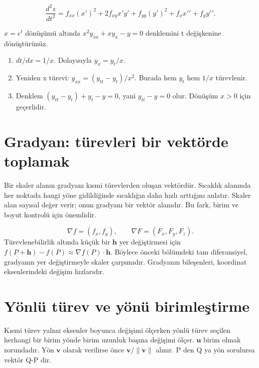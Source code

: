 {\small\[
\frac{d^2z}{dt^2}=f_{xx}(x\prime)^2+2f_{xy}x\prime y\prime+f_{yy}(y\prime)^2+f_xx\prime\prime+f_yy\prime\prime.
\]}
\begin{tcolorbox}[title={Örnek 6.8 | Dersteki diferansiyel denklem dönüşümü},colframe=accent]\(x=e^t\) dönüşümü altında \(x^2y_{xx}+xy_x-y=0\) denklemini t değişkenine dönüştürünüz.
\par{}\end{tcolorbox}
\begin{tcolorbox}[title={Adım adım çözüm},colback=green!3!white,colframe=green]\begin{enumerate}
\item \(dt/dx=1/x\). Dolayısıyla \(y_x=y_t/x\).
\item Yeniden x türevi: \(y_{xx}=(y_{tt}-y_t)/x^2\). Burada hem \(y_t\) hem \(1/x\) türevlenir.
\item Denklem \((y_{tt}-y_t)+y_t-y=0\), yani \(y_{tt}-y=0\) olur. Dönüşüm \(x>0\) için geçerlidir.
\end{enumerate}\end{tcolorbox}
\section{Gradyan: türevleri bir vektörde toplamak}
Bir skaler alanın gradyanı kısmi türevlerden oluşan vektördür. Sıcaklık alanında her noktada hangi yöne gidildiğinde sıcaklığın daha hızlı arttığını anlatır. Skaler alan sayısal değer verir; onun gradyanı bir vektör alanıdır. Bu fark, birim ve boyut kontrolü için önemlidir.


{\small\[
\nabla f=(f_x,f_y),\qquad\nabla F=(F_x,F_y,F_z).
\]}
Türevlenebilirlik altında küçük bir \(\mathbf h\) yer değiştirmesi için \(f(P+\mathbf h)-f(P)\approx\nabla f(P)\cdot\mathbf h\). Böylece önceki bölümdeki tam diferansiyel, gradyanın yer değiştirmeyle skaler çarpımıdır. Gradyanın bileşenleri, koordinat eksenlerindeki değişim hızlarıdır.

\section{Yönlü türev ve yönü birimleştirme}
Kısmi türev yalnız eksenler boyunca değişimi ölçerken yönlü türev seçilen herhangi bir birim yönde birim uzunluk başına değişimi ölçer. \(\mathbf u\) birim olmak zorundadır. Yön \(\mathbf v\) olarak verilirse önce \(\mathbf v/\|\mathbf v\|\) alınır. P den Q ya yön sorulursa vektör Q-P dir.


